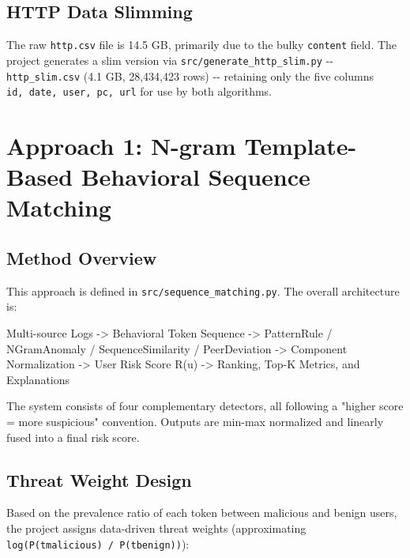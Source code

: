 \documentclass[
  a4paper,
  11pt]{article}
\newenvironment{Shaded}{}{}
\newcommand{\NormalTok}[1]{#1}
\begin{document}
\subsection{HTTP Data Slimming}\label{http-data-slimming}

The raw \texttt{http.csv} file is 14.5 GB, primarily due to the bulky
\texttt{content} field. The project generates a slim version via
\texttt{src/generate\_http\_slim.py} -\/- \texttt{http\_slim.csv} (4.1
GB, 28,434,423 rows) -\/- retaining only the five columns
\texttt{id,\ date,\ user,\ pc,\ url} for use by both algorithms.

\section{Approach 1: N-gram Template-Based Behavioral Sequence
Matching}\label{approach-1-n-gram-template-based-behavioral-sequence-matching}

\subsection{Method Overview}\label{method-overview}

This approach is defined in \texttt{src/sequence\_matching.py}. The
overall architecture is:

\begin{Shaded}
\begin{Highlighting}[]
\NormalTok{Multi{-}source Logs}
\NormalTok{  {-}\textgreater{} Behavioral Token Sequence}
\NormalTok{  {-}\textgreater{} PatternRule / NGramAnomaly / SequenceSimilarity / PeerDeviation}
\NormalTok{  {-}\textgreater{} Component Normalization}
\NormalTok{  {-}\textgreater{} User Risk Score R(u)}
\NormalTok{  {-}\textgreater{} Ranking, Top{-}K Metrics, and Explanations}
\end{Highlighting}
\end{Shaded}

The system consists of four complementary detectors, all following a
"higher score = more suspicious" convention. Outputs are min-max
normalized and linearly fused into a final risk score.

\subsection{Threat Weight Design}\label{threat-weight-design}

Based on the prevalence ratio of each token between malicious and benign
users, the project assigns data-driven threat weights (approximating
\texttt{log(P(t\textbar{}malicious)\ /\ P(t\textbar{}benign))}):
\end{document}
